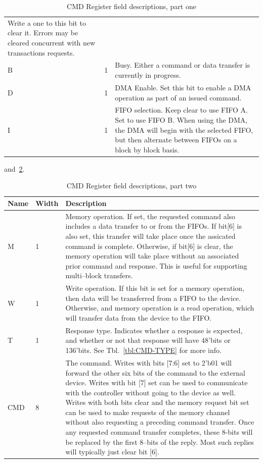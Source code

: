 \documentclass{gqtekspec}
\begin{document}
\begin{table}
\begin{center}
\begin{tabular}{|p{1.2in}|p{0.5in}|p{4.0in}|}
	Write a one to this bit to clear it.  Errors may be cleared concurrent
	with new transactions requests. \\
B & 1 & Busy.  Either a command or data transfer is currently in progress.\\
D & 1 & DMA Enable.  Set this bit to enable a DMA operation as part of an
	issued command. \\
I & 1 & FIFO selection.  Keep clear to use FIFO A.  Set to use FIFO B.
	When using the DMA, the DMA will begin with the selected FIFO, but then
	alternate between FIFOs on a block by block basis.  \\\hline
\end{tabular}
\caption{CMD Register field descriptions, part one}\label{tbl:CMD1}
\end{center}\end{table}
and~\ref{tbl:CMD2}.
\begin{table}\begin{center}
\begin{tabular}{|p{1.2in}|p{0.5in}|p{4.0in}|}\hline
	\rowcolor[gray]{0.85} Name & Width & Description\\\hline\hline
M & 1 & Memory operation.  If set, the requested command also includes a data
	transfer to or from the FIFOs.  If bit[6] is also set, this transfer
	will take place once the assicated command is complete.  Otherwise, if
	bit[6] is clear, the memory operation will take place without an
	associated prior command and response.  This is useful for supporting
	multi--block transfers. \\
W & 1 & Write operation.  If this bit is set for a memory operation, then
	data will be transferred from a FIFO to the device.  Otherwise, and
	memory operation is a read operation, which will transfer data from
	the device to the FIFO.\\
T & 1 & Response type.  Indicates whether a response is expected, and
	whether or not that response will have 48'bits or 136'bits.
	See Tbl.~\ref{tbl:CMD-TYPE} for more info.\\
CMD & 8 & The command.  Writes with bits [7:6] set to 2'b01 will forward
	the other six bits of the command to the external device.  Writes with
	bit [7] set can be used to communicate with the controller without
	going to the device as well.  Writes with both bits clear and the
	memory request bit set can be used to make requests of the memory
	channel without also requesting a preceding command transfer.  Once
	any requested command transfer completes, these 8-bits will be
	replaced by the first 8--bits of the reply.  Most such replies will
	typically just clear bit [6].
	\\\hline
\end{tabular}
\caption{CMD Register field descriptions, part two}\label{tbl:CMD2}
\end{center}\end{table}
\end{document}
